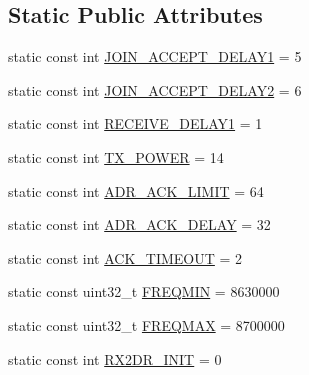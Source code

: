 \subsection*{Static Public Attributes}
\begin{DoxyCompactItemize}
\item 
static const int \mbox{\hyperlink{class_lora_regions_e_u_a29147d2d0ea7d37b346a4b2744ed8f3a}{J\+O\+I\+N\+\_\+\+A\+C\+C\+E\+P\+T\+\_\+\+D\+E\+L\+A\+Y1}} = 5
\item 
static const int \mbox{\hyperlink{class_lora_regions_e_u_add1f86dd2dd8a0f831b1f683e255af1d}{J\+O\+I\+N\+\_\+\+A\+C\+C\+E\+P\+T\+\_\+\+D\+E\+L\+A\+Y2}} = 6
\item 
static const int \mbox{\hyperlink{class_lora_regions_e_u_a2a3dacdfb28c15b378393a78b92e4dc0}{R\+E\+C\+E\+I\+V\+E\+\_\+\+D\+E\+L\+A\+Y1}} = 1
\item 
static const int \mbox{\hyperlink{class_lora_regions_e_u_a534cd22621dc34cf64c82e76f19ab86c}{T\+X\+\_\+\+P\+O\+W\+ER}} = 14
\item 
static const int \mbox{\hyperlink{class_lora_regions_e_u_a1fad07be37bf7e340241ea2303bba1cb}{A\+D\+R\+\_\+\+A\+C\+K\+\_\+\+L\+I\+M\+IT}} = 64
\item 
static const int \mbox{\hyperlink{class_lora_regions_e_u_a5a934e60781a74b7342a6842b62a7a18}{A\+D\+R\+\_\+\+A\+C\+K\+\_\+\+D\+E\+L\+AY}} = 32
\item 
static const int \mbox{\hyperlink{class_lora_regions_e_u_ae52a86b43d3428a3cc74dbf44d223cd3}{A\+C\+K\+\_\+\+T\+I\+M\+E\+O\+UT}} = 2
\item 
static const uint32\+\_\+t \mbox{\hyperlink{class_lora_regions_e_u_a685911245b727e6545f7004761da6c07}{F\+R\+E\+Q\+M\+IN}} = 8630000
\item 
static const uint32\+\_\+t \mbox{\hyperlink{class_lora_regions_e_u_a4427ef38b32c6d61ba9e755e822c85ee}{F\+R\+E\+Q\+M\+AX}} = 8700000
\item 
static const int \mbox{\hyperlink{class_lora_regions_e_u_aab1f4fd427de20da11c75a1bb187504f}{R\+X2\+D\+R\+\_\+\+I\+N\+IT}} = 0
\end{DoxyCompactItemize}
